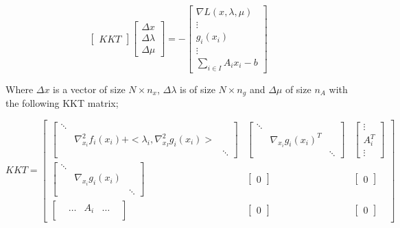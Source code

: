 \begin{equation} \label{eqn:1}
    \begin{bmatrix}
        KKT
    \end{bmatrix} 
    \begin{bmatrix}
       \Delta x \\
       \Delta \lambda \\
       \Delta \mu
    \end{bmatrix} = -
   \begin{bmatrix}
   \nabla L(x,\lambda,\mu) \\
   \vdots \\
   g_i(x_i) \\
   \vdots \\
   \sum\limits_{i \in I} A_{i} x_{i} - b
   \end{bmatrix}
\end{equation}  

Where $\Delta x$ is a vector of size $N \times n_x$, $\Delta \lambda$ is of size $N \times n_g$ and $\Delta \mu$ of size $n_A$ with the following KKT matrix;

\[
KKT = \begin{bmatrix}
    \begin{bmatrix}
        \ddots & & \\
        & \nabla_{x_i}^2 f_i(x_i) + <\lambda_i, \nabla_{x_I}^2 g_i(x_i)> & \\
        & & \ddots
    \end{bmatrix} &
    \begin{bmatrix}
        \ddots & & \\
        & \nabla_{x_i} g_i(x_i)^T & \\
        & & \ddots
    \end{bmatrix} &
    \begin{bmatrix}
        \vdots \\
        A_i^T \\
        \vdots
    \end{bmatrix} \\
     \begin{bmatrix}
        \ddots & & \\
        & \nabla_{x_i} g_i(x_i) & \\
        & & \ddots
    \end{bmatrix} &
    \begin{bmatrix}
        0
    \end{bmatrix} &
    \begin{bmatrix}
        0
    \end{bmatrix} \\
     \begin{bmatrix}
        & \hdots & A_i & \hdots & \\
    \end{bmatrix} &
    \begin{bmatrix}
        0
    \end{bmatrix} &
    \begin{bmatrix}
        0
    \end{bmatrix} 
\end{bmatrix}
\]


